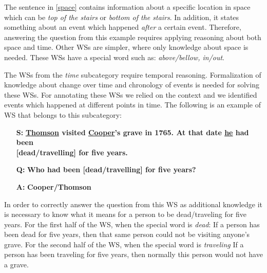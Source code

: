 The sentence in \ref{space} contains information about a specific location in space which can be \textit{top of the stairs} or \textit{bottom of the stairs}. In addition, it states something about an event which happened \textit{after} a certain event. Therefore, answering the question from this example requires applying reasoning about both space and time. Other WSs are simpler, where only knowledge about space is needed. These WSs have a special word such as: \textit{above/bellow, in/out}.

The WSs from the \textit{time} subcategory require temporal reasoning. 
Formalization of knowledge about change over time and chronology of events is needed for solving these WSs. For annotating these WSs we relied on the context and we identified events which happened at different points in time. The following is an example of WS that belongs to this subcategory:

\begin{itemize} \label{Ex2}
	\item[\textbf{S:}] \textbf{\underline{Thomson} visited \underline{Cooper}'s grave in 1765. At that date \underline{he} had been} \\ \textbf{[dead/travelling] for five years.}
	\item[\textbf{Q:}] \textbf{ Who had been [dead/travelling] for five years? }
	\item[\textbf{A:}] \textbf{Cooper/Thomson}
\end{itemize}
In order to correctly answer the question from this WS as additional knowledge it is necessary to know what it means for a person to be dead/traveling for five years. For the first half of the WS, when the special word is \textit{dead}: If a person has been dead for five years, then that same person could not be visiting anyone's grave. For the second half of the WS,  when the special word is \textit{traveling} If a person has been traveling for five years, then normally this person would not have a grave. 

